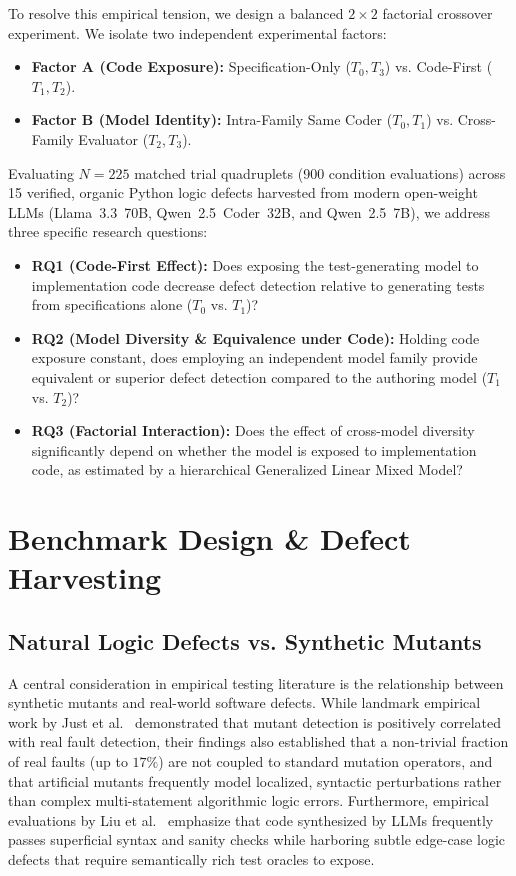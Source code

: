 \documentclass[11pt,a4paper]{article}
\begin{document}
To resolve this empirical tension, we design a balanced $2 \times 2$ factorial crossover experiment. We isolate two independent experimental factors:
\begin{itemize}
    \item \textbf{Factor A (Code Exposure):} Specification-Only ($T_0, T_3$) vs. Code-First ($T_1, T_2$).
    \item \textbf{Factor B (Model Identity):} Intra-Family Same Coder ($T_0, T_1$) vs. Cross-Family Evaluator ($T_2, T_3$).
\end{itemize}

Evaluating $N=225$ matched trial quadruplets (900 condition evaluations) across 15 verified, organic Python logic defects harvested from modern open-weight LLMs (Llama~3.3~70B, Qwen~2.5~Coder~32B, and Qwen~2.5~7B), we address three specific research questions:
\begin{itemize}
    \item \textbf{RQ1 (Code-First Effect):} Does exposing the test-generating model to implementation code decrease defect detection relative to generating tests from specifications alone ($T_0$ vs. $T_1$)?
    \item \textbf{RQ2 (Model Diversity \& Equivalence under Code):} Holding code exposure constant, does employing an independent model family provide equivalent or superior defect detection compared to the authoring model ($T_1$ vs. $T_2$)?
    \item \textbf{RQ3 (Factorial Interaction):} Does the effect of cross-model diversity significantly depend on whether the model is exposed to implementation code, as estimated by a hierarchical Generalized Linear Mixed Model?
\end{itemize}

\section{Benchmark Design \& Defect Harvesting}
\label{sec:benchmark}

\subsection{Natural Logic Defects vs. Synthetic Mutants}
A central consideration in empirical testing literature is the relationship between synthetic mutants and real-world software defects. While landmark empirical work by Just et al.~\cite{just2014mutants} demonstrated that mutant detection is positively correlated with real fault detection, their findings also established that a non-trivial fraction of real faults (up to $17\%$) are not coupled to standard mutation operators, and that artificial mutants frequently model localized, syntactic perturbations rather than complex multi-statement algorithmic logic errors. Furthermore, empirical evaluations by Liu et al.~\cite{liu2023evalplus} emphasize that code synthesized by LLMs frequently passes superficial syntax and sanity checks while harboring subtle edge-case logic defects that require semantically rich test oracles to expose.
\end{document}
